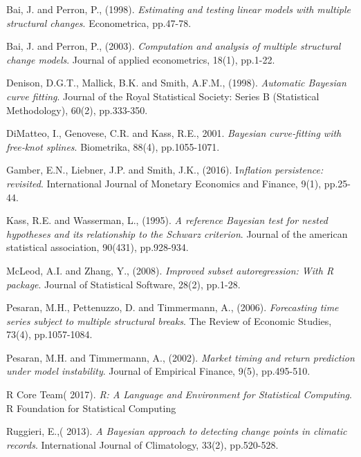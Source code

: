 \documentclass[submit]{smj}
\begin{document}
\begin{thebibliography}{99}
Bai, J. and Perron, P., (1998).
\textit{Estimating and testing linear models with multiple structural changes}.
Econometrica, pp.47-78.

Bai, J. and Perron, P., (2003).
\textit{ Computation and analysis of multiple structural change models}.
Journal of applied econometrics, 18(1), pp.1-22.

Denison, D.G.T., Mallick, B.K. and Smith, A.F.M., (1998). 
\textit{Automatic Bayesian curve fitting}. 
Journal of the Royal Statistical Society: Series B (Statistical Methodology), 60(2), pp.333-350.

DiMatteo, I., Genovese, C.R. and Kass, R.E., 2001. 
\textit{Bayesian curve‐fitting with free‐knot splines}. 
Biometrika, 88(4), pp.1055-1071.

Gamber, E.N., Liebner, J.P. and Smith, J.K., (2016). 
I\textit{nflation persistence: revisited}. 
International Journal of Monetary Economics and Finance, 9(1), pp.25-44.

Kass, R.E. and Wasserman, L., (1995). 
\textit{A reference Bayesian test for nested hypotheses and its relationship to the Schwarz criterion}. 
Journal of the american statistical association, 90(431), pp.928-934.

McLeod, A.I. and Zhang, Y., (2008).
\textit{ Improved subset autoregression: With R package}. 
 Journal of Statistical Software, 28(2), pp.1-28.

Pesaran, M.H., Pettenuzzo, D. and Timmermann, A., (2006). 
\textit{Forecasting time series subject to multiple structural breaks}. 
The Review of Economic Studies, 73(4), pp.1057-1084.

Pesaran, M.H. and Timmermann, A., (2002).
\textit{Market timing and return prediction under model instability}. 
Journal of Empirical Finance, 9(5), pp.495-510.

R Core Team( 2017). 
\textit{R: A Language and Environment for Statistical Computing}.
R Foundation for Statistical Computing

Ruggieri, E.,( 2013). 
\textit{A Bayesian approach to detecting change points in climatic records}.
International Journal of Climatology, 33(2), pp.520-528.


\end{thebibliography}
\end{document}
